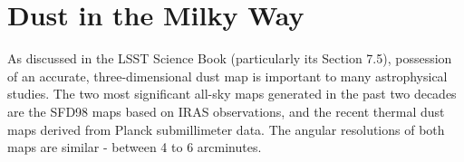 %
%
%
%
%
%
%

\section{Dust in the Milky Way}
\def\secname{MW_Dust}\label{sec:\secname} %



As discussed in the LSST Science Book (particularly its Section 7.5),
possession of an accurate, three-dimensional dust map is important to
many astrophysical studies. The two most significant all-sky maps
generated in the past two decades are the SFD98 maps based on IRAS
observations, and the recent thermal dust maps derived from Planck
submillimeter data. The angular resolutions of both maps are similar -
between 4 to 6 arcminutes.

